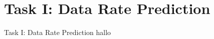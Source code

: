 \section{Task I: Data Rate Prediction}
\begin{frame}{Task I: Data Rate Prediction}
hallo 
\end{frame}
